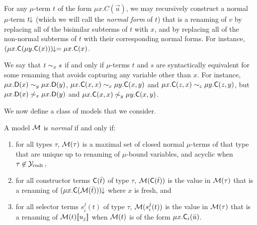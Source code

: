 For any $\mu$-term $t$ of the form $\mu x. C( \vec u )$, we may recursively construct a normal $\mu$-term ${t}\!\!\downarrow$
(which we will call the \emph{normal form} of $t$)
that is a renaming of $v$ by replacing all of the bisimilar subterms of $t$ with $x$,
and by replacing all of the non-normal subterms of $t$ with their corresponding normal forms.
For instance, ${(\mu x. \textsf{C}( \mu y. \textsf{C}( x ) ))}\!\!\downarrow = \mu x. \textsf{C}( x )$.

We say that $t \sim_{x} s$ if and only if $\mu$-terms $t$ and $s$ are syntactically equivalent
for some renaming that avoids capturing any variable other than $x$.
For instance, 
$\mu x. \textsf{D}( x ) \sim_{y} \mu x. \textsf{D}( y )$,
$\mu x. \textsf{C}( x, x ) \sim_{x} \mu y. \textsf{C}( x, y )$ and
$\mu x. \textsf{C}( z, x ) \sim_{z} \mu y. \textsf{C}( z, y )$,
but
$\mu x. \textsf{D}( x ) \not\sim_{x} \mu x. \textsf{D}( y )$ and
$\mu x. \textsf{C}( x, x ) \not\sim_{y} \mu y. \textsf{C}( x, y )$.


We now define a class of models that we consider.

\begin{definition} \label{def:norm-model}
A model $\mathcal{M}$ is \emph{normal} if and only if:
\begin{enumerate}
\item 
for all types $\tau$, 
$\mathcal{M}( \tau )$ is a maximal set of closed normal $\mu$-terms of that type that are 
unique up to renaming of $\mu$-bound variables,
and acyclic when $\tau \not\in \mathcal{Y}_{\mathrm{codt}}$,
\item 
for all constructor terms $\textsf{C}( \bar t )$ of type $\tau$,
$\mathcal{M}( \textsf{C}( \bar t ) )$ is the value 
in $\mathcal{M}( \tau )$ that is a renaming of 
${(\mu x. \textsf{C}( \mathcal{M}( \bar t ) ))}\!\!\downarrow$ where $x$ is fresh, and
\item 
for all selector terms $s^j_i( t )$ of type $\tau$,%
$\mathcal{M}( s^j_i( t ) )$ is the value
in $\mathcal{M}( \tau )$ that is a renaming of 
$\mathcal{M}( t )[\![ u_j ]\!]$
when $\mathcal{M}( t )$ is of the form $\mu x. \textsf{C}_i( \bar u )$.
\end{enumerate}
\end{definition}

